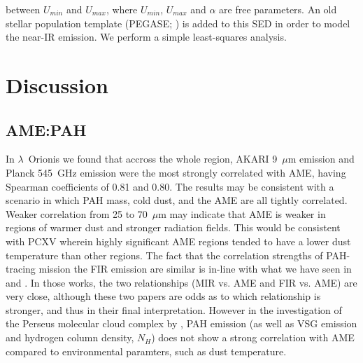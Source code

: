     between $U_{min}$ and $U_{max}$, where $U_{min}$, $U_{max}$ and $\alpha{}$ are free parameters. An old stellar population template (PEGASE; \citep{fioc97}) is added to this SED in order to model the near-IR emission. We perform a simple least-squares analysis.


  \section{Discussion}
    \subsection{AME:PAH}

      In  $\lambda$~Orionis we found that accross the whole region, AKARI 9~$\mu$m emission and Planck 545~GHz emission were the most strongly correlated with AME, having Spearman coefficients of 0.81 and 0.80. The results may be consistent with a scenario in which PAH mass, cold dust, and the AME are all tightly correlated. Weaker correlation from 25 to 70~$\mu$m may indicate that AME is weaker in regions of warmer dust and stronger radiation fields. This would be consistent with PCXV wherein highly significant AME regions tended to have a lower dust temperature than other regions. The fact that the correlation strengths of PAH-tracing mission the FIR emission are similar is in-line with what we have seen in \cite{ysard10b} and \cite{hensley16}. In those works, the two relationships (MIR vs. AME and FIR vs. AME) are very close, although these two papers are odds as to which relationship is stronger, and thus in their final interpretation. However in the investigation of the Perseus molecular cloud complex by \cite{tibbs11}, PAH emission (as well as VSG emission and hydrogen column density, $N_{H}$) does not show a strong correlation with AME compared to environmental paramters, such as dust temperature.
